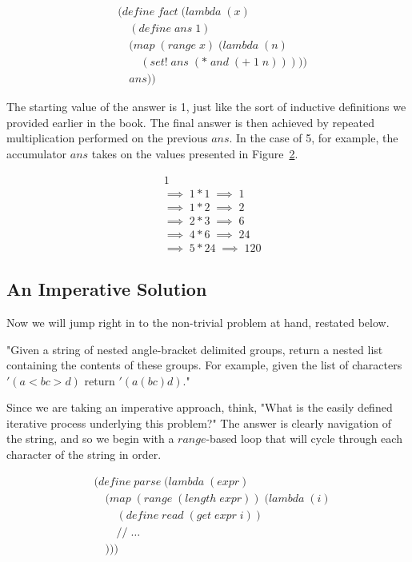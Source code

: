 \begin{figure}[htp]
\caption{}\label{fig:imperFactExample}
\begin{align*}
& (define \; fact \; (lambda \; (x)
\\& \quad (define \; ans \; 1)
\\& \quad (map \; (range \; x) \; (lambda \; (n)
\\& \qquad (set! \; ans \; (* \; and \; (+ \; 1 \; n)))))
\\& \quad ans))
\end{align*}
\end{figure}

The starting value of the answer is 1, just like the sort of inductive definitions we 
provided earlier in the book. The final answer is then achieved by repeated 
multiplication performed on the previous $ans$. In the case of 5, for example, the 
accumulator $ans$ takes on the values presented in Figure~\ref{fig:ansValues}.

\begin{figure}[htp]
\caption{}\label{fig:ansValues}
\begin{align*}
& 1
\\& \implies \; 1*1 \; \implies \; 1
\\& \implies \; 1*2 \; \implies \; 2
\\& \implies \; 2*3 \; \implies \; 6
\\& \implies \; 4*6 \; \implies \; 24
\\& \implies \; 5*24 \; \implies \; 120
\end{align*}
\end{figure}

\subsection{An Imperative Solution}
Now we will jump right in to the non-trivial problem at hand, restated below.

"Given a string of nested angle-bracket delimited groups, return a
nested list containing the contents of these groups. For example,
given the list of characters $'(a < b c > d)$ return $'(a (b c) d)$."

Since we are taking an imperative approach, think, "What is the easily defined iterative 
process underlying this problem?" The answer is clearly navigation of the string, and so 
we begin with a $range$-based loop that will cycle through each character of the string 
in order.

\begin{figure}[htp]
\caption{}\label{fig:loopParse}
\begin{align*}
& (define \; parse \; (lambda \; (expr) \; 
\\& \quad (map \; (range \; (length \; expr)) \; (lambda \; (i)
\\& \qquad (define \; read \; (get \; expr \; i))
\\& \qquad // \; \dots
\\& \quad )))
\end{align*}
\end{figure}

